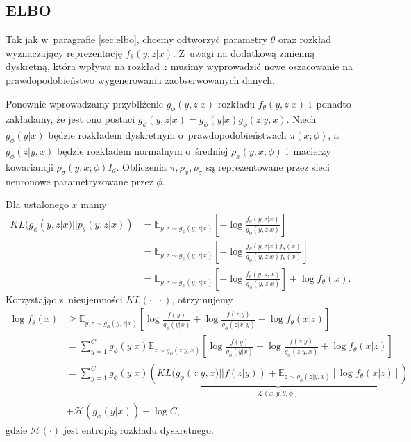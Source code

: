 \documentclass{iithesis}
\begin{document}
\subsection{ELBO}
Tak jak w~paragrafie \ref{sec:elbo}, chcemy odtworzyć parametry $\theta$ oraz rozkład
wyznaczający reprezentację $f_\theta(y,z|x)$. Z~uwagi na dodatkową zmienną dyskretną, która
wpływa na rozkład $z$ musimy wyprowadzić nowe oszacowanie na prawdopodobieństwo wygenerowania
zaobserwowanych danych.

Ponownie wprowadzamy przybliżenie $g_\phi(y,z|x)$ rozkładu $f_\theta(y,z|x)$ i~ponadto
zakładamy, że jest ono postaci $g_\phi(y,z|x) = g_\phi(y|x) g_\phi(z|y,x)$.
Niech $g_\phi(y|x)$ będzie rozkładem dyskretnym o~prawdopodobieństwach $\pi(x;\phi)$,
a $g_\phi(z|y,x)$ będzie rozkładem normalnym o~średniej $\rho_x(y,x;\phi)$ i~macierzy
kowariancji $\rho_\sigma(y,x;\phi)I_d$. Obliczenia $\pi,\rho_x,\rho_\sigma$ są
reprezentowane przez sieci neuronowe parametryzowane przez $\phi$.

Dla ustalonego $x$ mamy
\begin{equation}
\begin{split}
KL(g_\phi(y,z|x)||p_\theta(y,z|x)) &= \mathbb{E}_{y,z \sim g_\phi(y,z|x)}
\left[ -\log \frac{f_\theta(y,z|x)}{g_\phi(y,z|x)} \right] \\
&= \mathbb{E}_{y,z \sim g_\phi(y,z|x)} \left[ -\log \frac{f_\theta(y,z|x) f_\theta(x)}{g_\phi(y,z|x) f_\theta(x)} \right] \\
&= \mathbb{E}_{y,z \sim g_\phi(y,z|x)} \left[ -\log \frac{f_\theta(y,z,x)}{g_\phi(y,z|x)} \right] + \log f_\theta(x).
\end{split}
\end{equation}
Korzystając z~nieujemności $KL(\cdotp||\cdotp)$, otrzymujemy
\begin{equation}
\begin{split}
\log f_\theta(x) &\geq \mathbb{E}_{y,z \sim g_\phi(y,z|x)} \left[ \log \frac{f(y)}{g_\phi(y|x)}
+ \log \frac{f(z|y)}{g_\phi(z|x,y)} + \log f_\theta(x|z) \right] \\
&= \sum_{y=1}^C g_\phi(y|x) \mathbb{E}_{z \sim g_\phi(z|y,x)} \left[
\log \frac{f(y)}{g_\phi(y|x)} + \log \frac{f(z|y)}{g_\phi(z|y,x)} + \log f_\theta(x|z) \right] \\
&= \sum_{y=1}^C g_\phi(y|x) \underbrace{\left(KL(g_\phi(z|y,x)||f(z|y))
+ \mathbb{E}_{z \sim g_\phi(z|y,x)}[\log f_\theta(x|z)]\right)}_{\mathcal{L}(x,y,\theta,\phi)} \\
&+ \mathcal{H}(g_\phi(y|x)) - \log C,
\end{split}
\end{equation}
gdzie $\mathcal{H}(\cdotp)$ jest entropią rozkładu dyskretnego.
\end{document}
